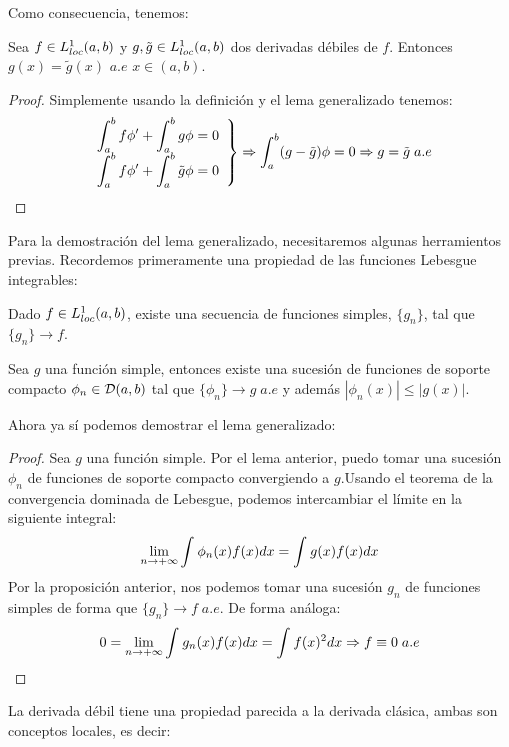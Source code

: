 Como consecuencia, tenemos:

\begin{coro}
Sea $f\in L^1_{loc}(a,b)$ y $g,\tilde{g}\in L^1_{loc}(a,b)$ dos derivadas débiles de $f$. Entonces $g(x)=\tilde{g}(x)$ $a.e$ $x\in(a,b)$.
\end{coro}

\begin{proof}
Simplemente usando la definición y el lema generalizado tenemos:
\[
\left.
\begin{array}{c}
\displaystyle\int_{ a }^{ b } f\phi'+\displaystyle\int_{ a }^{ b } g\phi=0 \\
\displaystyle\int_{ a }^{ b } f\phi'+\displaystyle\int_{ a }^{ b } \tilde{g}\phi=0
\end{array}
\right\} \Rightarrow \displaystyle\int_{ a }^{ b } (g-\tilde{g})\phi=0 \Rightarrow g=\tilde{g} \; a.e
\]
\end{proof}

Para la demostración del lema generalizado, necesitaremos algunas herramientos previas. Recordemos primeramente una propiedad de las funciones Lebesgue integrables:

\begin{prop}
Dado $f\in L^1_{loc}(a,b)$, existe una secuencia de funciones simples, $\{g_n\}$, tal que $\{g_n\}\longrightarrow f$.
\end{prop}

\begin{lemma}
Sea $g$ una función simple, entonces existe una sucesión de funciones de soporte compacto $\phi_n\in\mathcal{D}(a,b)$ tal que $\{\phi_n\}\longrightarrow g \; a.e$ y además $|\phi_n(x)|\leq|g(x)|$.
\end{lemma}

Ahora ya sí podemos demostrar el lema generalizado:

\begin{proof}
Sea $g$ una función simple. Por el lema anterior, puedo tomar una sucesión $\phi_n$ de funciones de soporte compacto convergiendo a $g$.Usando el teorema de la convergencia dominada de Lebesgue, podemos intercambiar el límite en la siguiente integral:
\[
\displaystyle\lim_{  n  \to +\infty }  \displaystyle\int_{  }^{  } \phi_n(x)f(x)dx =\displaystyle\int_{  }^{  } g(x)f(x)dx
\]
Por la proposición anterior, nos podemos tomar una sucesión $g_n$ de funciones simples de forma que $\{g_n\}\longrightarrow f \; a.e$. De forma análoga:
\[
0=\displaystyle\lim_{  n  \to +\infty }  \displaystyle\int_{  }^{  } g_n(x)f(x)dx =\displaystyle\int_{  }^{  } f(x)^2dx \Rightarrow f\equiv 0 \; a.e
\]
\end{proof}

La derivada débil tiene una propiedad parecida a la derivada clásica, ambas son conceptos locales, es decir:

